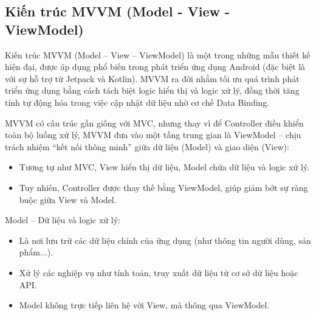 \subsection{Kiến trúc MVVM (Model - View - ViewModel)}
\renewcommand{\labelitemi}{--}    
    \begin{flushleft}
        \hspace*{0.8cm}Kiến trúc MVVM (Model – View – ViewModel) là một trong những mẫu thiết kế hiện đại, được áp dụng phổ biến trong phát triển ứng dụng Android (đặc biệt là với sự hỗ trợ từ Jetpack và Kotlin). MVVM ra đời nhằm tối ưu quá trình phát triển ứng dụng bằng cách tách biệt logic hiển thị và logic xử lý, đồng thời tăng tính tự động hóa trong việc cập nhật dữ liệu nhờ cơ chế Data Binding.
    \end{flushleft}

    \begin{flushleft}
      \hspace*{0.8cm}MVVM có cấu trúc gần giống với MVC, nhưng thay vì để Controller điều khiển toàn bộ luồng xử lý, MVVM đưa vào một tầng trung gian là ViewModel – chịu trách nhiệm “kết nối thông minh” giữa dữ liệu (Model) và giao diện (View):
      \setlength{\leftmargini}{1.5cm}
      \begin{itemize}
          \item Tương tự như MVC, View hiển thị dữ liệu, Model chứa dữ liệu và logic xử lý.
          \item Tuy nhiên, Controller được thay thế bằng ViewModel, giúp giảm bớt sự ràng buộc giữa View và Model.
      \end{itemize}
    \end{flushleft}

    \begin{flushleft}
      \hspace*{0.8cm}Model – Dữ liệu và logic xử lý:
      \setlength{\leftmargini}{1.5cm}
      \begin{itemize}
          \item Là nơi lưu trữ các dữ liệu chính của ứng dụng (như thông tin người dùng, sản phẩm...).
          \item Xử lý các nghiệp vụ như tính toán, truy xuất dữ liệu từ cơ sở dữ liệu hoặc API.
          \item Model không trực tiếp liên hệ với View, mà thông qua ViewModel.
      \end{itemize}
    \end{flushleft}

